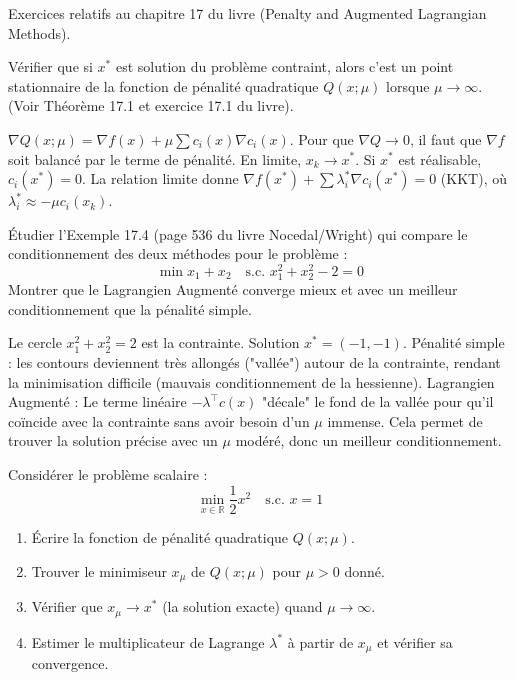 Exercices relatifs au chapitre 17 du livre (Penalty and Augmented Lagrangian Methods).

\bigskip
\begin{exercice}
Vérifier que si $x^*$ est solution du problème contraint, alors c'est un point stationnaire de la fonction de pénalité quadratique $Q(x; \mu)$ lorsque $\mu \to \infty$. 
(Voir Théorème 17.1 et exercice 17.1 du livre).
\end{exercice}

\begin{correction}
$\nabla Q(x; \mu) = \nabla f(x) + \mu \sum c_i(x) \nabla c_i(x)$.
Pour que $\nabla Q \to 0$, il faut que $\nabla f$ soit balancé par le terme de pénalité.
En limite, $x_k \to x^*$.
Si $x^*$ est réalisable, $c_i(x^*) = 0$.
La relation limite donne $\nabla f(x^*) + \sum \lambda_i^* \nabla c_i(x^*) = 0$ (KKT), où $\lambda_i^* \approx -\mu c_i(x_k)$.
\end{correction}
\bigskip

\bigskip
\begin{exercice}
Étudier l'Exemple 17.4 (page 536 du livre Nocedal/Wright) qui compare le conditionnement des deux méthodes pour le problème :
$$ \min x_1 + x_2 \quad \text{s.c. } x_1^2 + x_2^2 - 2 = 0 $$
Montrer que le Lagrangien Augmenté converge mieux et avec un meilleur conditionnement que la pénalité simple.
\end{exercice}

\begin{correction}
Le cercle $x_1^2 + x_2^2 = 2$ est la contrainte. Solution $x^*=(-1,-1)$.
Pénalité simple : les contours deviennent très allongés ("vallée") autour de la contrainte, rendant la minimisation difficile (mauvais conditionnement de la hessienne).
Lagrangien Augmenté : Le terme linéaire $-\lambda^\top c(x)$ "décale" le fond de la vallée pour qu'il coïncide avec la contrainte sans avoir besoin d'un $\mu$ immense.
Cela permet de trouver la solution précise avec un $\mu$ modéré, donc un meilleur conditionnement.
\end{correction}
\bigskip

\bigskip
\begin{exercice}
Considérer le problème scalaire :
$$ \min_{x \in \mathbb{R}} \frac{1}{2}x^2 \quad \text{s.c. } x = 1 $$
\begin{enumerate}
    \item Écrire la fonction de pénalité quadratique $Q(x; \mu)$.
    \item Trouver le minimiseur $x_\mu$ de $Q(x; \mu)$ pour $\mu > 0$ donné.
    \item Vérifier que $x_\mu \to x^*$ (la solution exacte) quand $\mu \to \infty$.
    \item Estimer le multiplicateur de Lagrange $\lambda^*$ à partir de $x_\mu$ et vérifier sa convergence.
\end{enumerate}
\end{exercice}

